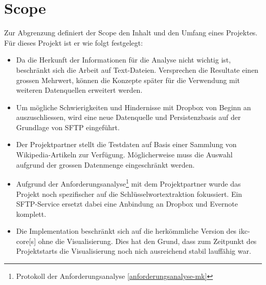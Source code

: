 \section{Scope}\label{sec:scope} 
Zur Abgrenzung definiert der Scope den Inhalt und den Umfang eines Projektes. Für dieses Projekt ist er wie folgt festgelegt:
\begin{itemize}
    \item Da die Herkunft der Informationen für die Analyse nicht wichtig ist, beschränkt sich die Arbeit auf Text-Dateien. Versprechen die Resultate einen grossen Mehrwert, können die Konzepte spä\-ter für die Verwendung mit weiteren Datenquellen erweitert werden.
    \item Um mögliche Schwierigkeiten und Hindernisse mit Dropbox von Beginn an auszuschliessen, wird eine neue Datenquelle und Persistenzbasis auf der Grundlage von \gls{SFTP} eingeführt.
    \item Der Projektpartner stellt die Testdaten auf Basis einer Sammlung von Wikipedia-Artikeln zur Verfügung. Möglicherweise muss die Auswahl aufgrund der grossen Datenmenge ein\-ge\-schränkt werden.
    \item Aufgrund der Anforderungsanalyse\footnote{{Protokoll der Anforderungsanalyse \autoref{anforderungsanalyse-mk}}} mit dem Projektpartner wurde das Projekt noch spezifischer auf die Schlüss\-el\-wort\-ex\-traktion fokussiert. Ein \gls{SFTP}-Service ersetzt dabei eine Anbindung an Dropbox und Evernote komplett.
    \item Die Implementation beschränkt sich auf die herkömmliche Version des \gls{ikc-core}[s] ohne die Visualisierung. Dies hat den Grund, dass zum Zeitpunkt des Projektstarts die Visualisierung noch nich ausreichend stabil lauffähig war.
\end{itemize}

